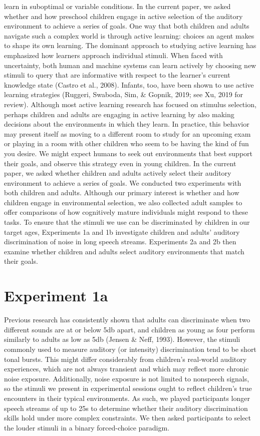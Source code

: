\documentclass[10pt, letterpaper]{article}
\begin{document}
learn in suboptimal or variable conditions. In the current paper, we
asked whether and how preschool children engage in active selection of
the auditory environment to achieve a series of goals. One way that both
children and adults navigate such a complex world is through active
learning: choices an agent makes to shape its own learning. The dominant
approach to studying active learning has emphasized how learners
approach individual stimuli. When faced with uncertainty, both human and
machine systems can learn actively by choosing new stimuli to query that
are informative with respect to the learner's current knowledge state
(Castro et al., 2008). Infants, too, have been shown to use active
learning strategies (Ruggeri, Swaboda, Sim, \& Gopnik, 2019; see Xu,
2019 for review). Although most active learning research has focused on
stimulus selection, perhaps children and adults are engaging in active
learning by also making decisions about the environments in which they
learn. In practice, this behavior may present itself as moving to a
different room to study for an upcoming exam or playing in a room with
other children who seem to be having the kind of fun you desire. We
might expect humans to seek out environments that best support their
goals, and observe this strategy even in young children. In the current
paper, we asked whether children and adults actively select their
auditory environment to achieve a series of goals. We conducted two
experiments with both children and adults. Although our primary interest
is whether and how children engage in environmental selection, we also
collected adult samples to offer comparisons of how cognitively mature
individuals might respond to these tasks. To ensure that the stimuli we
use can be discriminated by children in our target ages, Experiments 1a
and 1b investigate children and adults' auditory discrimination of noise
in long speech streams. Experiments 2a and 2b then examine whether
children and adults select auditory environments that match their goals.

\hypertarget{experiment-1a}{%
\section{\texorpdfstring{\textbf{Experiment
1a}}{Experiment 1a}}\label{experiment-1a}}

Previous research has consistently shown that adults can discriminate
when two different sounds are at or below 5db apart, and children as
young as four perform similarly to adults as low as 5db (Jensen \& Neff,
1993). However, the stimuli commonly used to measure auditory (or
intensity) discrimination tend to be short tonal bursts. This might
differ considerably from children's real-world auditory experiences,
which are not always transient and which may reflect more chronic noise
exposure. Additionally, noise exposure is not limited to nonspeech
signals, so the stimuli we present in experimental sessions ought to
reflect children's true encounters in their typical environments. As
such, we played participants longer speech streams of up to 25s to
determine whether their auditory discrimination skills hold under more
complex constraints. We then asked participants to select the louder
stimuli in a binary forced-choice paradigm.
\end{document}
